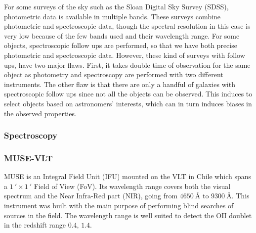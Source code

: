 For some surveys of the sky such as the Sloan Digital Sky Survey (SDSS), photometric data is available in multiple bands. These surveys combine photometric and spectroscopic data, though the spectral resolution in this case is very low because of the few bands used and their wavelength range. For some objects, spectroscopic follow ups are performed, so that we have both precise photometric and spectroscopic data. However, these kind of surveys with follow ups, have two major flaws. First, it takes double time of observation for the same object as photometry and spectroscopy are performed with two different instruments. The other flaw is that there are only a handful of galaxies with spectroscopic follow ups since not all the objects can be observed. This induces to select objects based on astronomers' interests, which can in turn induces biases in the observed properties.

\subsubsection{Spectroscopy}


\subsubsection{MUSE-VLT}
\label{subsubsec:MUSE-VLT}

MUSE is an Integral Field Unit (IFU) mounted on the VLT in Chile which spans a $\SI{1}{\arcmin} \times \SI{1}{\arcmin}$ Field of View (FoV). Its wavelength range covers both the visual spectrum and the Near Infra-Red part (NIR), going from $\SI{4650}{\angstrom}$ to $\SI{9300}{\angstrom}$. This instrument was built with the main purpose of performing blind searches of sources in the field. The wavelength range is well suited to detect the OII doublet in the redshift range $0.4$, $1.4$.